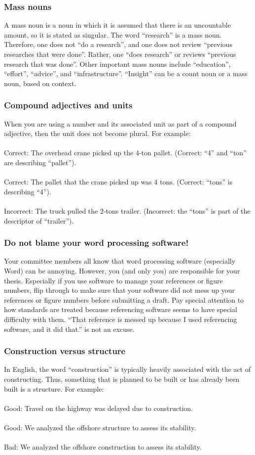 \documentclass{article}
\begin{document}
\subsubsection{Mass nouns}
A mass noun is a noun in which it is assumed that there is an uncountable amount, so it is stated as singular. The word “research” is a mass noun. Therefore, one does not “do a research”, and one does not review “previous researches that were done”. Rather, one “does research” or reviews “previous research that was done”. Other important mass nouns include “education”, “effort”, “advice”, and “infrastructure”. “Insight” can be a count noun or a mass noun, based on context.

\subsubsection{Compound adjectives and units}
When you are using a number and its associated unit as part of a compound adjective, then the unit does not become plural. For example:
\\\\Correct: The overhead crane picked up the 4-ton pallet. (Correct: “4” and “ton” are describing “pallet”).
\\\\Correct: The pallet that the crane picked up was 4 tons. (Correct: “tons” is describing “4”).
\\\\Incorrect: The truck pulled the 2-tons trailer. (Incorrect: the “tons” is part of the descriptor of “trailer”).

\subsubsection{Do not blame your word processing software!}
Your committee members all know that word processing software (especially Word) can be annoying. However, you (and only you) are responsible for your thesis. Especially if you use software to manage your references or figure numbers, flip through to make sure that your software did not mess up your references or figure numbers before submitting a draft. Pay special attention to how standards are treated because referencing software seems to have special difficulty with them. “That reference is messed up because I used referencing software, and it did that.” is not an excuse.

\subsubsection{Construction versus structure}
In English, the word “construction” is typically heavily associated with the act of constructing. Thus, something that is planned to be built or has already been built is a structure. For example:
\\\\Good: Travel on the highway was delayed due to construction.
\\\\Good: We analyzed the offshore structure to assess its stability.
\\\\Bad: We analyzed the offshore construction to assess its stability.
\end{document}
